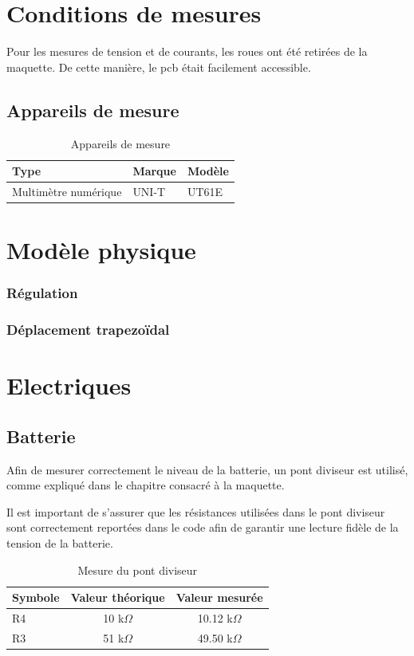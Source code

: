 \section{Conditions de mesures}
Pour les mesures de tension et de courants, les roues ont été retirées de la maquette. De cette manière, le \Gls{pcb} était facilement accessible.

\subsection{Appareils de mesure}

\begin{table}[H]
    \centering
    \begin{tabular}{|l|l|l|}
        \hline
        \textbf{Type} & \textbf{Marque} & \textbf{Modèle} \\
        \hline
        Multimètre numérique & UNI-T & UT61E \\
        \hline
    \end{tabular}
    \caption{Appareils de mesure}
    \label{tab:appareils_mesure}
\end{table}


\section{Modèle physique}
\subsubsection{Régulation}
\subsubsection{Déplacement trapezoïdal}

\section{Electriques}
\subsection{Batterie}
Afin de mesurer correctement le niveau de la batterie, un pont diviseur est utilisé, comme expliqué dans le chapitre consacré à la maquette.

Il est important de s'assurer que les résistances utilisées dans le pont diviseur sont correctement reportées dans le code afin de garantir une lecture fidèle de la tension de la batterie.

\begin{table}[H]
    \centering
    \begin{tabular}{|l|c|c|}
        \hline
        \textbf{Symbole} & \textbf{Valeur théorique} & \textbf{Valeur mesurée} \\
        \hline
        R4 & 10 k$\Omega$ & 10.12 k$\Omega$ \\
        \hline
        R3 & 51 k$\Omega$ & 49.50 k$\Omega$ \\
        \hline
    \end{tabular}
    \caption{Mesure du pont diviseur}
    \label{tab:mesure_pont_diviseur}
\end{table}

